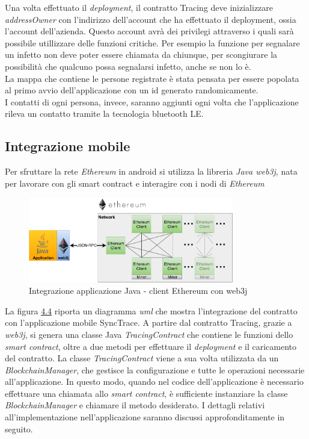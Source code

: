 Una volta effettuato il \emph{\gls{deployment}}\glsfirstoccur, il contratto Tracing deve inizializzare \textit{addressOwner} con l'indirizzo dell'account che ha effettuato il deployment, ossia l'account dell'azienda. Questo account avrà dei privilegi attraverso i quali sarà possibile utillizzare delle funzioni critiche. Per esempio la funzione per segnalare un infetto non deve poter essere chiamata da chiunque, per scongiurare la possibilità che qualcuno possa segnalarsi infetto, anche se non lo è.\\
La mappa che contiene le persone registrate è stata pensata per essere popolata al primo avvio dell'applicazione con un id generato randomicamente.\\
I contatti di ogni persona, invece, saranno aggiunti ogni volta che l'applicazione rileva un contatto tramite la tecnologia bluetooth LE.

\subsection{Integrazione mobile}
Per sfruttare la rete \textit{Ethereum} in android si utilizza la libreria \textit{Java web3j}, nata per lavorare con gli smart contract e interagire con i nodi di \textit{Ethereum}
\begin{figure}[h]
\caption{Integrazione applicazione Java - client Ethereum con web3j}
\centering
\includegraphics[width=0.8\textwidth]{./immagini/web3j_network.png}
\end{figure}
\FloatBarrier
La figura \hyperref[fig:umlapp]{4.4} riporta un diagramma \textit{uml} che mostra l'integrazione del contratto con l'applicazione mobile SyncTrace.
A partire dal contratto Tracing, grazie a \textit{web3j}, si genera una classe Java \textit{TracingContract} che contiene le funzioni dello \textit{smart contract}, oltre a due metodi per effettuare il \textit{deployment} e il caricamento del contratto.
La classe \textit{TracingContract} viene a sua volta utilizzata da un \textit{BlockchainManager}, che gestisce la configurazione e tutte le operazioni necessarie all'applicazione.
In questo modo, quando nel codice dell'applicazione è necessario effettuare una chiamata allo \textit{smart contract}, è sufficiente instanziare la classe \textit{BlockchainManager} e chiamare il metodo desiderato.
I dettagli relativi all'implementazione nell'applicazione saranno discussi approfonditamente in seguito.

